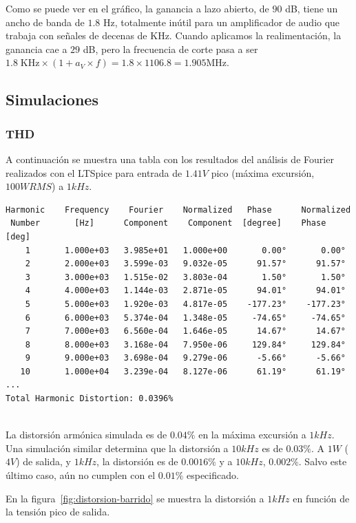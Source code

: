 \documentclass[a4paper,12pt,twoside]{article}
\begin{document}
Como se puede ver en el gráfico, la ganancia a lazo abierto, de $90$ dB, tiene un ancho de banda de $1.8$ Hz, totalmente inútil para un amplificador de audio que trabaja con señales de decenas de KHz. Cuando aplicamos la realimentación, la ganancia cae a $29$ dB, pero la frecuencia de corte pasa a ser $1.8\; \mathrm{KHz} \times (1 + a_V \times f) = 1.8 \times 1106.8 = 1.905 \mathrm{MHz}$.



\subsection{Simulaciones}


\subsubsection{THD} A continuación se muestra una tabla con los resultados del análisis de Fourier realizados con el LTSpice para entrada de $1.41V$ pico (máxima excursión, $100W RMS$) a $1kHz$. 




\begin{verbatim}
Harmonic	Frequency	 Fourier 	Normalized	 Phase  	Normalized
 Number 	  [Hz]   	Component	 Component	[degree]	Phase [deg]
    1   	1.000e+03	3.985e+01	1.000e+00	    0.00°	    0.00°
    2   	2.000e+03	3.599e-03	9.032e-05	   91.57°	   91.57°
    3   	3.000e+03	1.515e-02	3.803e-04	    1.50°	    1.50°
    4   	4.000e+03	1.144e-03	2.871e-05	   94.01°	   94.01°
    5   	5.000e+03	1.920e-03	4.817e-05	 -177.23°	 -177.23°
    6   	6.000e+03	5.374e-04	1.348e-05	  -74.65°	  -74.65°
    7   	7.000e+03	6.560e-04	1.646e-05	   14.67°	   14.67°
    8   	8.000e+03	3.168e-04	7.950e-06	  129.84°	  129.84°
    9   	9.000e+03	3.698e-04	9.279e-06	   -5.66°	   -5.66°
   10   	1.000e+04	3.239e-04	8.127e-06	   61.19°	   61.19°
...
Total Harmonic Distortion: 0.0396%


\end{verbatim}

La distorsión armónica simulada es de $0.04\%$ en la máxima excursión a $1kHz$. Una simulación similar determina que la distorsión a $10kHz$ es de $0.03\%$. A $1W$ ($4V$) de salida, y $1kHz$, la distorsión es de $0.0016\%$ y a $10kHz$, $0.002\%$. Salvo este último caso, aún no cumplen con el $0.01\%$ especificado.


En la figura~\ref{fig:distorsion-barrido} se muestra la distorsión a $1kHz$ en función de la tensión pico de salida.
\end{document}
